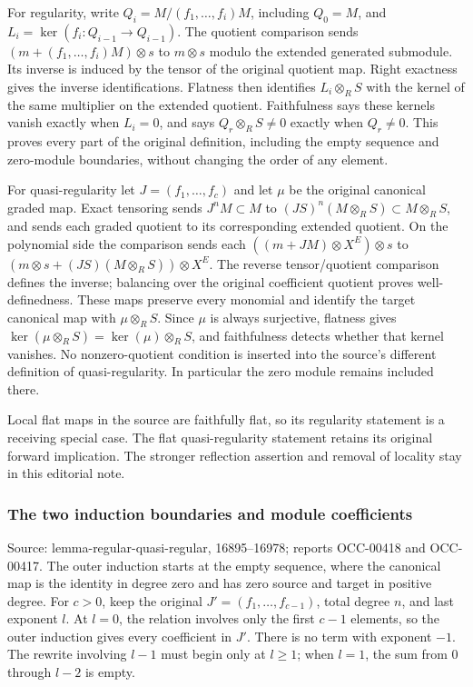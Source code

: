 For regularity, write \(Q_i=M/(f_1,\ldots,f_i)M\), including \(Q_0=M\), and \(L_i=\ker(f_i:Q_{i-1}\to Q_{i-1})\). The quotient comparison sends \((m+(f_1,\ldots,f_i)M)\otimes s\) to \(m\otimes s\) modulo the extended generated submodule. Its inverse is induced by the tensor of the original quotient map. Right exactness gives the inverse identifications. Flatness then identifies \(L_i\otimes_RS\) with the kernel of the same multiplier on the extended quotient. Faithfulness says these kernels vanish exactly when \(L_i=0\), and says \(Q_r\otimes_RS\ne0\) exactly when \(Q_r\ne0\). This proves every part of the original definition, including the empty sequence and zero-module boundaries, without changing the order of any element.

For quasi-regularity let \(J=(f_1,\ldots,f_c)\) and let \(\mu\) be the original canonical graded map. Exact tensoring sends \(J^nM\subset M\) to \((JS)^n(M\otimes_RS)\subset M\otimes_RS\), and sends each graded quotient to its corresponding extended quotient. On the polynomial side the comparison sends each \(((m+JM)\otimes X^E)\otimes s\) to \((m\otimes s+(JS)(M\otimes_RS))\otimes X^E\). The reverse tensor/quotient comparison defines the inverse; balancing over the original coefficient quotient proves well-definedness. These maps preserve every monomial and identify the target canonical map with \(\mu\otimes_RS\). Since \(\mu\) is always surjective, flatness gives \(\ker(\mu\otimes_RS)=\ker(\mu)\otimes_RS\), and faithfulness detects whether that kernel vanishes. No nonzero-quotient condition is inserted into the source's different definition of quasi-regularity. In particular the zero module remains included there.

Local flat maps in the source are faithfully flat, so its regularity statement is a receiving special case. The flat quasi-regularity statement retains its original forward implication. The stronger reflection assertion and removal of locality stay in this editorial note.

\subsubsection{The two induction boundaries and module coefficients}\label{algebra-proof-006-the-two-induction-boundaries-and-module-coefficients}

Source: lemma-\AlgebraIdentifierBreak{}regular-\AlgebraIdentifierBreak{}quasi-\AlgebraIdentifierBreak{}regular, 16895--16978; reports OCC-00418 and OCC-00417. The outer induction starts at the empty sequence, where the canonical map is the identity in degree zero and has zero source and target in positive degree. For \(c>0\), keep the original \(J'=(f_1,\ldots,f_{c-1})\), total degree \(n\), and last exponent \(l\). At \(l=0\), the relation involves only the first \(c-1\) elements, so the outer induction gives every coefficient in \(J'\). There is no term with exponent \(-1\). The rewrite involving \(l-1\) must begin only at \(l\geq1\); when \(l=1\), the sum from 0 through \(l-2\) is empty.

